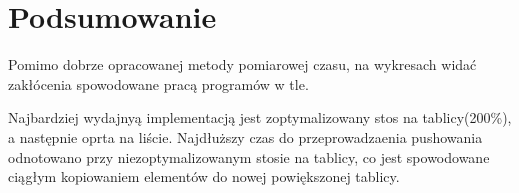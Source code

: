 \documentclass[11pt]{article}
\begin{document}
\section{Podsumowanie}
Pomimo dobrze opracowanej metody pomiarowej czasu, na wykresach widać zakłócenia spowodowane pracą programów w tle.


Najbardziej wydajnyą implementacją jest zoptymalizowany stos na tablicy(200\%), a następnie oprta na liście. Najdłuższy czas do przeprowadzaenia pushowania odnotowano przy niezoptymalizowanym stosie na tablicy, co jest spowodowane ciągłym kopiowaniem 
 elementów do nowej powiększonej tablicy.
\end{document}
